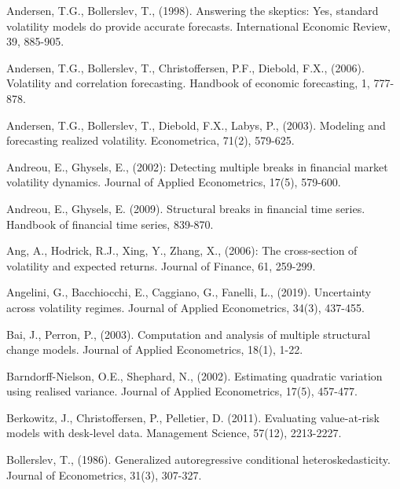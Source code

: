 \documentclass[preprint,12pt,authoryear]{elsarticle}
\newcommand{\condensedspacing}{\linespread{1.1}}  %
\begin{document}
\begin{thebibliography}{00}
\condensedspacing
{}
Andersen, T.G., Bollerslev, T., (1998). Answering the skeptics: Yes, standard volatility models do provide accurate forecasts. International Economic Review, 39, 885-905.

Andersen, T.G., Bollerslev, T., Christoffersen, P.F., Diebold, F.X., (2006). Volatility and
correlation forecasting. Handbook of economic forecasting, 1, 777-878.

Andersen, T.G., Bollerslev, T., Diebold, F.X., Labys, P., (2003). Modeling and forecasting realized volatility. Econometrica, 71(2), 579-625.

Andreou, E., Ghysels, E., (2002): Detecting multiple breaks in financial market volatility dynamics. Journal of Applied Econometrics, 17(5), 579-600.

Andreou, E., Ghysels, E. (2009). Structural breaks in financial time series. Handbook of financial time series, 839-870.

Ang, A., Hodrick, R.J., Xing, Y., Zhang, X., (2006): The cross-section of volatility and expected returns. Journal of Finance, 61, 259-299.

Angelini, G., Bacchiocchi, E., Caggiano, G., Fanelli, L., (2019).
Uncertainty across volatility regimes. Journal of Applied
Econometrics, 34(3), 437-455.

Bai, J., Perron, P., (2003).
Computation and analysis of multiple structural change models.
Journal of Applied Econometrics, 18(1), 1-22.

Barndorff-Nielson, O.E., Shephard, N., (2002). Estimating quadratic variation using realised variance. Journal of Applied Econometrics, 17(5), 457-477.

 Berkowitz, J., Christoffersen, P., Pelletier, D. (2011). Evaluating value-at-risk models with desk-level data. Management Science, 57(12), 2213-2227.

 Bollerslev, T., (1986). Generalized autoregressive conditional heteroskedasticity. Journal of Econometrics, 31(3), 307-327.


\end{thebibliography}
\end{document}
